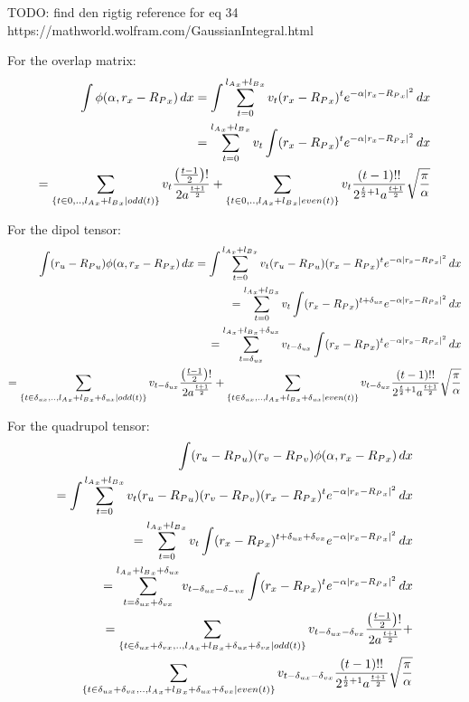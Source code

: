 TODO: find den rigtig reference for eq 34 https://mathworld.wolfram.com/GaussianIntegral.html

For the overlap matrix:
\begin{align}
    \int \phi(\alpha,r_x-{R_P}_x)\,dx = \int \sum_{t=0}^{{l_A}_x+{l_B}_x}v_t(r_x-{R_P}_x)^te^{-\alpha|r_x-{R_P}_x|^2}\,dx\\
        =  \sum_{t=0}^{{l_A}_x+{l_B}_x}v_t\int(r_x-{R_P}_x)^{t}e^{-\alpha|r_x-{R_P}_x|^2}\,dx\notag\\
        =  \sum_{\{t\in0,..,{l_A}_x+{l_B}_x | odd(t)\}}v_{t}\frac{\left(\frac{t-1}{2}\right)!}{2a^{\frac{t+1}{2}}}+
        \sum_{\{t\in0,..,{l_A}_x+{l_B}_x | even(t)\}}v_{t}\frac{\left(t-1\right)!!}{2^{\frac{t}{2}+1}a^{\frac{t+1}{2}}}\sqrt{\frac{\pi}{\alpha}}\notag
\end{align}

For the dipol tensor:
\begin{align}
    \int (r_u-{R_P}_u)\phi(\alpha,r_x-{R_P}_x)\,dx = \int \sum_{t=0}^{{l_A}_x+{l_B}_x}v_t(r_u-{R_P}_u)(r_x-{R_P}_x)^te^{-\alpha|r_x-{R_P}_x|^2}\,dx\\
        =  \sum_{t=0}^{{l_A}_x+{l_B}_x}v_t\int(r_x-{R_P}_x)^{t+\delta_{ux}}e^{-\alpha|r_x-{R_P}_x|^2}\,dx\notag\\
        =  \sum_{t=\delta_{ux}}^{{l_A}_x+{l_B}_x+\delta_{ux}}v_{t-\delta_{ux}}\int(r_x-{R_P}_x)^{t}e^{-\alpha|r_x-{R_P}_x|^2}\,dx\notag\\
        =  \sum_{\{t\in\delta_{ux},..,{l_A}_x+{l_B}_x+\delta_{ux} | odd(t)\}}v_{t-\delta_{ux}}\frac{\left(\frac{t-1}{2}\right)!}{2a^{\frac{t+1}{2}}}+
        \sum_{\{t\in\delta_{ux},..,{l_A}_x+{l_B}_x+\delta_{ux} | even(t)\}}v_{t-\delta_{ux}}\frac{\left(t-1\right)!!}{2^{\frac{t}{2}+1}a^{\frac{t+1}{2}}}\sqrt{\frac{\pi}{\alpha}}\notag
\end{align}

For the quadrupol tensor:
\begin{align}
    \int (r_u-{R_P}_u)(r_v-{R_P}_v)\phi(\alpha,r_x-{R_P}_x)\,dx \\
    = \int \sum_{t=0}^{{l_A}_x+{l_B}_x}v_t(r_u-{R_P}_u)(r_v-{R_P}_v)(r_x-{R_P}_x)^te^{-\alpha|r_x-{R_P}_x|^2}\,dx\notag\\
        =  \sum_{t=0}^{{l_A}_x+{l_B}_x}v_t\int(r_x-{R_P}_x)^{t+\delta_{ux}+\delta_{vx}}e^{-\alpha|r_x-{R_P}_x|^2}\,dx\notag\\
        =  \sum_{t=\delta_{ux}+\delta_{vx}}^{{l_A}_x+{l_B}_x+\delta_{ux}}v_{t-\delta_{ux}-\delta_{-vx}}\int(r_x-{R_P}_x)^{t}e^{-\alpha|r_x-{R_P}_x|^2}\,dx\notag\\
        =  \sum_{\{t\in\delta_{ux}+\delta_{vx},..,{l_A}_x+{l_B}_x+\delta_{ux}+\delta_{vx} | odd(t)\}}v_{t-\delta_{ux}-\delta_{vx}}\frac{\left(\frac{t-1}{2}\right)!}{2a^{\frac{t+1}{2}}}+\notag\\
        \sum_{\{t\in\delta_{ux}+\delta_{vx},..,{l_A}_x+{l_B}_x+\delta_{ux}+\delta_{vx} | even(t)\}}v_{t-\delta_{ux}-\delta_{vx}}\frac{\left(t-1\right)!!}{2^{\frac{t}{2}+1}a^{\frac{t+1}{2}}}\sqrt{\frac{\pi}{\alpha}}\notag
\end{align}

